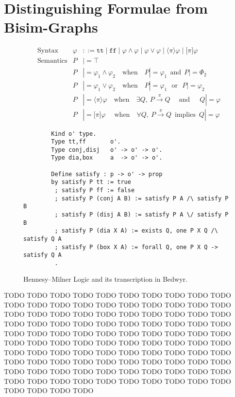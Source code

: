 \documentclass{llncs}
\begin{document}
\section{Distinguishing Formulae from Bisim-Graphs}\label{sec:ccsdf}

\begin{figure}
\begin{align*}
&\text{Syntax} &
\varphi & ::= \texttt{tt} \mid \texttt{ff}
    \mid \varphi \land \varphi \mid \varphi \lor \varphi
    \mid \langle\pi\rangle \varphi \mid \lbrack\pi\rbrack \varphi
\\
&\text{Semantics} &
  P & |= \top \\&&
  P & |= \varphi_1 \land \varphi_2 \quad\text{when}\quad P |= \varphi_1 ~~\text{and}~~ P |= \varPhi_2 \\&&
  P & |= \varphi_1 \lor \varphi_2 \quad\text{when}\quad P |= \varphi_1 ~~~\text{or}~~~ P |= \varphi_2 \\&&
  P & |= \langle \pi \rangle \varphi \quad\text{when}\quad \exists Q,~ P\xrightarrow{\pi} Q \;\quad\text{and}\quad\;\, Q |= \varphi \\&&
  P & |= \lbrack \pi \rbrack \varphi \;\quad\text{when}\quad \forall Q,~ P\xrightarrow{\pi} Q ~\;\text{implies}~\; Q |= \varphi
\end{align*}
\vspace*{-3ex}
\begin{verbatim}
        Kind o' type.
        Type tt,ff       o'.
        Type conj,disj   o' -> o' -> o'.
        Type dia,box     a  -> o' -> o'. 

        Define satisfy : p -> o' -> prop
        by satisfy P tt := true
         ; satisfy P ff := false
         ; satisfy P (conj A B) := satisfy P A /\ satisfy P B
         ; satisfy P (disj A B) := satisfy P A \/ satisfy P B
         ; satisfy P (dia X A) := exists Q, one P X Q /\ satisfy Q A
         ; satisfy P (box X A) := forall Q, one P X Q -> satisfy Q A
         .
\end{verbatim}
\vspace*{-2ex}
\caption{Hennesy--Milner Logic and its transcription in Bedwyr.}
  \label{TODO}
\end{figure}

TODO TODO TODO TODO TODO TODO TODO TODO TODO TODO TODO TODO TODO
TODO TODO TODO TODO TODO TODO TODO TODO TODO TODO TODO TODO TODO
TODO TODO TODO TODO TODO TODO TODO TODO TODO TODO TODO TODO TODO
TODO TODO TODO TODO TODO TODO TODO TODO TODO TODO TODO TODO TODO
TODO TODO TODO TODO TODO TODO TODO TODO TODO TODO TODO TODO TODO
TODO TODO TODO TODO TODO TODO TODO TODO TODO TODO TODO TODO TODO
TODO TODO TODO TODO TODO TODO TODO TODO TODO TODO TODO TODO TODO
TODO TODO TODO TODO TODO TODO TODO TODO TODO TODO TODO TODO TODO
\end{document}
